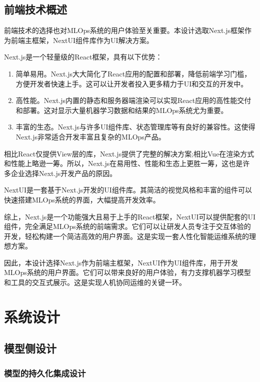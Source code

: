 \documentclass{HDU-Bachelor-Thesis}
\begin{document}
\subsection{前端技术概述}

前端技术的选择也对MLOps系统的用户体验至关重要。本设计选取Next.js框架作为前端主框架，NextUI组件库作为UI解决方案。

Next.js是一个轻量级的React框架，具有以下优势：

\begin{enumerate}   
    \item 简单易用。Next.js大大简化了React应用的配置和部署，降低前端学习门槛，方便开发者快速上手。这可以让开发者投入更多精力于UI和交互的开发中。
    \item 高性能。Next.js内置的静态和服务器端渲染可以实现React应用的高性能交付和部署。这对显示大量机器学习数据和结果的MLOps系统尤为重要。  
    \item 丰富的生态。Next.js与许多UI组件库、状态管理库等有良好的兼容性。这使得Next.js非常适合开发丰富且复杂的MLOps产品。  
\end{enumerate}

相比React仅提供View层的库，Next.js提供了完整的解决方案;相比Vue在渲染方式和性能上略逊一筹。所以，Next.js在易用性、性能和生态上更胜一筹，这也是许多企业选择Next.js开发产品的原因。

NextUI是一套基于Next.js开发的UI组件库。其简洁的视觉风格和丰富的组件可以快速搭建MLOps系统的界面，大幅提高开发效率。

综上，Next.js是一个功能强大且易于上手的React框架，NextUI可以提供配套的UI组件，完全满足MLOps系统的前端需求。它们可以让研发人员专注于交互体验的开发，轻松构建一个简洁高效的用户界面。这是实现一套人性化智能运维系统的理想方案。

因此，本设计选择Next.js作为前端主框架，NextUI作为UI组件库，用于开发MLOps系统的用户界面。它们可以带来良好的用户体验，有力支撑机器学习模型和工具的交互式展示。这是实现人机协同运维的关键一环。

\setcounter{table}{0}
\setcounter{figure}{0}
\clearpage
\section{系统设计}
\subsection{模型侧设计}
\subsubsection{模型的持久化集成设计}
\end{document}
